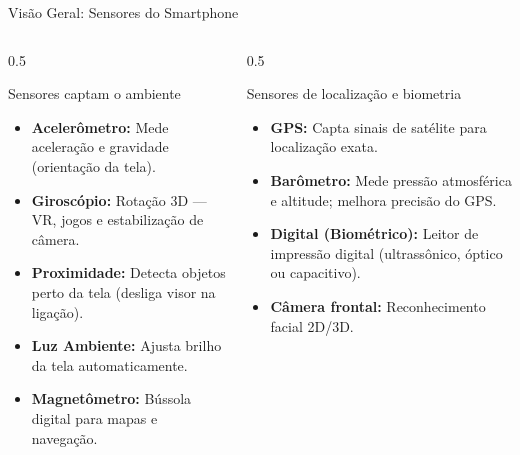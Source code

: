 \documentclass[aspectratio=169]{beamer}
\begin{document}
\begin{frame}{Visão Geral: Sensores do Smartphone}
    \begin{columns}[T]
        \begin{column}{0.5\textwidth}
            \begin{block}{Sensores captam o ambiente}
                \begin{itemize}
                    \item \textbf{Acelerômetro:} Mede aceleração e gravidade (orientação da tela).
                    \item \textbf{Giroscópio:} Rotação 3D — VR, jogos e estabilização de câmera.
                    \item \textbf{Proximidade:} Detecta objetos perto da tela (desliga visor na ligação).
                    \item \textbf{Luz Ambiente:} Ajusta brilho da tela automaticamente.
                    \item \textbf{Magnetômetro:} Bússola digital para mapas e navegação.
                \end{itemize}
            \end{block}
        \end{column}
        \begin{column}{0.5\textwidth}
            \begin{block}{Sensores de localização e biometria}
                \begin{itemize}
                    \item \textbf{GPS:} Capta sinais de satélite para localização exata.
                    \item \textbf{Barômetro:} Mede pressão atmosférica e altitude; melhora precisão do GPS.
                    \item \textbf{Digital (Biométrico):} Leitor de impressão digital (ultrassônico, óptico ou capacitivo).
                    \item \textbf{Câmera frontal:} Reconhecimento facial 2D/3D.
                \end{itemize}
            \end{block}
        \end{column}
    \end{columns}
\end{frame}
\end{document}
